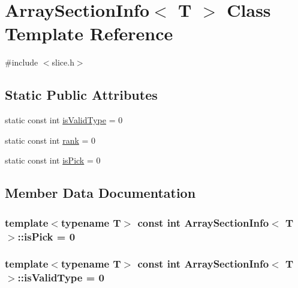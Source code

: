 \hypertarget{classArraySectionInfo}{}\section{Array\+Section\+Info$<$ T $>$ Class Template Reference}
\label{classArraySectionInfo}


{\ttfamily \#include $<$slice.\+h$>$}

\subsection*{Static Public Attributes}
\begin{DoxyCompactItemize}
\item 
static const int \hyperlink{classArraySectionInfo_af2fa5407d842de2ebb6887c7ca4a711c}{is\+Valid\+Type} = 0
\item 
static const int \hyperlink{classArraySectionInfo_a8b6c7fecb060615d9f697928aea42d8c}{rank} = 0
\item 
static const int \hyperlink{classArraySectionInfo_a9ca261397aff03a51d954f0d98f3ec7e}{is\+Pick} = 0
\end{DoxyCompactItemize}


\subsection{Member Data Documentation}
\hypertarget{classArraySectionInfo_a9ca261397aff03a51d954f0d98f3ec7e}{}
\subsubsection[{is\+Pick}]{\setlength{\rightskip}{0pt plus 5cm}template$<$typename T$>$ const int {\bf Array\+Section\+Info}$<$ T $>$\+::is\+Pick = 0\hspace{0.3cm}{\ttfamily [static]}}\label{classArraySectionInfo_a9ca261397aff03a51d954f0d98f3ec7e}
\hypertarget{classArraySectionInfo_af2fa5407d842de2ebb6887c7ca4a711c}{}
\subsubsection[{is\+Valid\+Type}]{\setlength{\rightskip}{0pt plus 5cm}template$<$typename T$>$ const int {\bf Array\+Section\+Info}$<$ T $>$\+::is\+Valid\+Type = 0\hspace{0.3cm}{\ttfamily [static]}}\label{classArraySectionInfo_af2fa5407d842de2ebb6887c7ca4a711c}
\hypertarget{classArraySectionInfo_a8b6c7fecb060615d9f697928aea42d8c}{}
